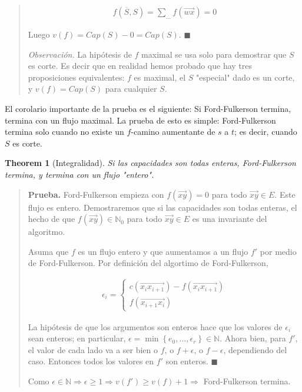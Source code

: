\documentclass[a4paper, 12pt]{article}
\newtheorem{theorem}{Theorem}
\newtheorem{theorem}{Theorem}
\begin{document}
\begin{quote}
\begin{align*}
    f(\overline{S}, S) = \sum_{\ldots} f(\overrightarrow{wx}) = 0
\end{align*}

Luego $v(f) = Cap(S) - 0 = Cap(S)$. $\blacksquare$

\textit{Observación.} La hipótesis de $f$ maximal se usa solo para demostrar que $S$
es corte. Es decir que en realidad hemos probado que hay tres proposiciones
equivalentes: $f$ es maximal, el $S$ "especial" dado es un corte, y $v(f) =
Cap(S)$ para cualquier $S$.

\end{quote}
\normalsize

El corolario importante de la prueba es el siguiente: Si Ford-Fulkerson termina,
termina con un flujo maximal. La prueba de esto es simple: Ford-Fulkerson
termina solo cuando no existe un $f$-camino aumentante de $s$ a $t$; es decir,
cuando $S$ es corte.

\begin{theorem}[Integralidad]
    Si las capacidades son todas enteras, Ford-Fulkerson termina, y termina con
    un flujo "entero".
\end{theorem}


\small
\begin{quote}

\textbf{Prueba.} Ford-Fulkerson empieza con $f(\overrightarrow{xy}) = 0$ para
todo $\overrightarrow{xy} \in E$. Este flujo es entero. Demostraremos que si las
capacidades son todas enteras, el hecho de que $f(\overrightarrow{xy}) \in
\mathbb{N}_0$ para todo $\overrightarrow{xy} \in E$ es una invariante del
algoritmo.

Asuma que $f$ es un flujo entero y que aumentamos a un flujo $f'$ por medio de
Ford-Fulkerson. Por definición del algortimo de Ford-Fulkerson, 

\begin{align*}
    \epsilon_i = \begin{cases}
        c(\overrightarrow{x_i x_{i+1}}) - f(\overrightarrow{x_i x_{i+1}}) \\  
        f(\overrightarrow{x_{i+1}x_i})
    \end{cases}
\end{align*}

La hipótesis de que los argumentos son enteros hace que los valores de
$\epsilon_i$ sean enteros; en particular, $\epsilon = \min \left\{ e_0, \ldots,
\epsilon_r \right\} \in \mathbb{N}$. Ahora bien, para $f'$, el valor de cada
lado va a ser bien o $f$, o $f + \epsilon$, o $f - \epsilon$, dependiendo del
caso. Entonces todos los valores en $f'$ son enteros. $\blacksquare$

Como $\epsilon \in \mathbb{N} \Rightarrow \epsilon \geq 1 \Rightarrow v(f') \geq
v(f) + 1 \Rightarrow $ Ford-Fulkerson termina.

\end{quote}
\normalsize
\end{document}
